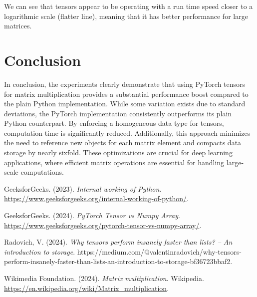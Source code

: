 \documentclass[12pt]{article}
\begin{document}
\noindent We can see that tensors appear to be operating with a run time speed closer to a logarithmic scale (flatter line), meaning that it has better performance for large matrices.

\section{Conclusion}
In conclusion, the experiments clearly demonstrate that using PyTorch tensors for matrix multiplication provides a substantial performance boost compared to the plain Python implementation.
While some variation exists due to standard deviations, the PyTorch implementation consistently outperforms its plain Python counterpart.
By enforcing a homogeneous data type for tensors, computation time is significantly reduced.
Additionally, this approach minimizes the need to reference new objects for each matrix element and compacts data storage by nearly sixfold.
These optimizations are crucial for deep learning applications, where efficient matrix operations are essential for handling large-scale computations.

\newpage

\begin{thebibliography}{4}
    GeeksforGeeks. (2023). \textit{Internal working of Python}. \url{https://www.geeksforgeeks.org/internal-working-of-python/}.
    
    GeeksforGeeks. (2024). \textit{PyTorch Tensor vs Numpy Array}. \url{https://www.geeksforgeeks.org/pytorch-tensor-vs-numpy-array/}.

    Radovich, V. (2024). \textit{Why tensors perform insanely faster than lists? -- An introduction to storage}. https://medium.com/@valentinradovich/why-tensors-perform-insanely-faster-than-lists-an-introduction-to-storage-bf36723bbaf2.


    Wikimedia Foundation. (2024). \textit{Matrix multiplication}. Wikipedia. \url{https://en.wikipedia.org/wiki/Matrix_multiplication}.
\end{thebibliography}
\end{document}
